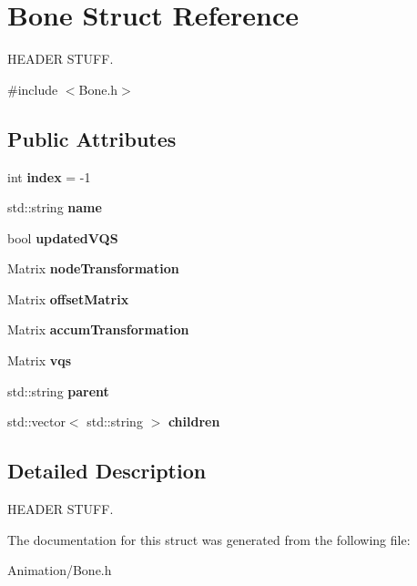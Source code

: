 \hypertarget{structBone}{}\section{Bone Struct Reference}
\label{structBone}


H\+E\+A\+D\+ER S\+T\+U\+FF.  




{\ttfamily \#include $<$Bone.\+h$>$}

\subsection*{Public Attributes}
\begin{DoxyCompactItemize}
\item 
\mbox{\label{structBone_a3d53cb062a59cf7966c3ca349b4bf279}} 
int {\bfseries index} = -\/1
\item 
\mbox{\label{structBone_a4a293e3b0c32acf3903dccc1b33f486d}} 
std\+::string {\bfseries name}
\item 
\mbox{\label{structBone_a731f54503d8ec7c6b5b5cff43632d7b0}} 
bool {\bfseries updated\+V\+QS}
\item 
\mbox{\label{structBone_ad4cfc4f4ecc95e81c57a53211b8fbfbe}} 
Matrix {\bfseries node\+Transformation}
\item 
\mbox{\label{structBone_ae1e3070057b964c1bccfc32e47d07485}} 
Matrix {\bfseries offset\+Matrix}
\item 
\mbox{\label{structBone_acbfed5eb858b150cdd5f71d5c71c9ada}} 
Matrix {\bfseries accum\+Transformation}
\item 
\mbox{\label{structBone_ac17103f2ecea9327dd879ff86143c7b8}} 
Matrix {\bfseries vqs}
\item 
\mbox{\label{structBone_a4363529bb8d3cbfaf7d880a584f9c8a8}} 
std\+::string {\bfseries parent}
\item 
\mbox{\label{structBone_a599afdb3c9495891c532b0d40753f286}} 
std\+::vector$<$ std\+::string $>$ {\bfseries children}
\end{DoxyCompactItemize}


\subsection{Detailed Description}
H\+E\+A\+D\+ER S\+T\+U\+FF. 

The documentation for this struct was generated from the following file\+:\begin{DoxyCompactItemize}
\item 
Animation/Bone.\+h\end{DoxyCompactItemize}
